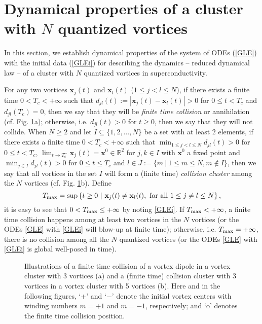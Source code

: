 \documentclass{aims}
\theoremstyle{plain}
\theoremstyle{definition}
\newcommand{\bx}{{\mathbf x}}
\begin{document}
\section{Dynamical properties of a cluster with $N$ quantized vortices}
\setcounter{equation}{0}
\setcounter{figure}{0}
In this section, we establish dynamical properties of the system of ODEs
(\ref{GLE}) with the initial data (\ref{GLEi}) for describing
the dynamics -- reduced dynamical law -- of a cluster with $N$ quantized vortices in superconductivity.



For any two vortices $\bx_j(t)$ and $\bx_l(t)$ ($1\le j<l\le N$),
if there exists a finite time $0<T_c<+\infty$ such that $d_{jl}(t):=|\bx_j(t)-\bx_l(t)|>0$ for $0\le t< T_c$ and
$d_{jl}(T_c)=0$, then we say that they will be {\sl finite time collision}
or annihilation (cf. Fig. \ref{collion1}a);
otherwise, i.e. $d_{jl}(t)>0$ for $t\ge0$, then we say that they will
not collide. When $N\ge 2$ and let $I\subseteq \{1,2,\ldots,N\}$
be a set with at least $2$ elements, if there exists a finite time $0<T_c<+\infty$ such that $\min_{1\le j< l\le N} d_{jl}(t)>0$ for $0\le t< T_c$, $\lim_{t\to T_c^-} \bx_j(t)=\bx^0\in {\mathbb R}^2$ for $j,k\in I$ with $\bx^0$ a fixed point and $\min_{j\in I} d_{jl}(t)>0$ for $0\le t\le  T_c$ and $l\in J:=\{m\ |\ 1\le m \le N, m\notin I\}$,
then we say that all vortices in the set $I$ will form a (finite time) {\sl collision cluster} among the $N$ vortices (cf. Fig. \ref{collion1}b). Define
\[T_{\rm max}=\sup\left\{t\ge0\ |~\mathbf x_j(t)\neq \mathbf
x_l(t),\ \hbox{for all} \ 1\le j\neq l\le N \right\},\]
it is easy to see that $0<T_{\rm max}\le +\infty$ by noting \eqref{GLEi}.
If $T_{\rm max}<+\infty$, a finite time collision happens among
at least two vortices in the $N$ vortices (or the ODEs \eqref{GLE} with \eqref{GLEi} will blow-up at finite time); otherwise, i.e. $T_{\rm max}=+\infty$, there is no collision among all
the $N$ quantized vortices (or the ODEs \eqref{GLE} with \eqref{GLEi}
is global well-posed in time).


\begin{figure}[htbp]
\centerline{
}
\caption{Illustrations of a finite time collision of a vortex dipole in
a vortex cluster with 3 vortices (a) and
a (finite time) collision cluster with 3 vortices in
a vortex cluster with 5 vortices (b). Here and in the following figures,
`+' and `$-$' denote the initial vortex centers with winding numbers
$m=+1$ and $m=-1$, respectively; and `o' denotes the finite time collision position.}
\label{collion1}
\end{figure}
\end{document}
